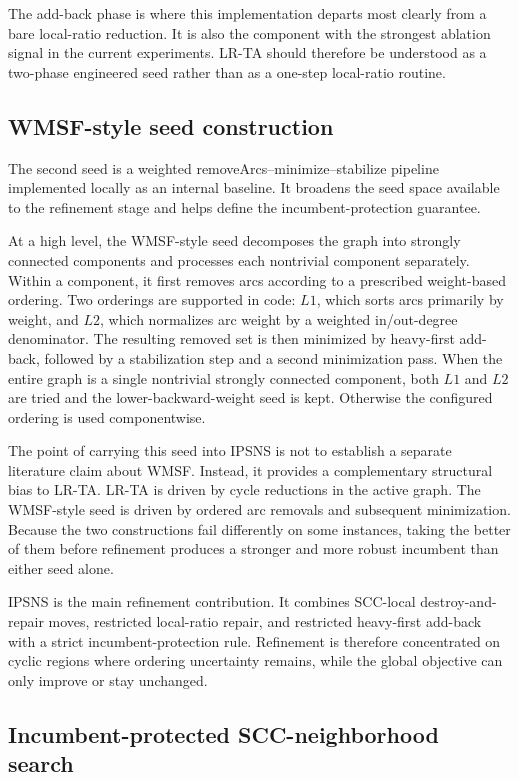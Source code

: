 The add-back phase is where this implementation departs most clearly from a bare local-ratio reduction. It is also the component with the strongest ablation signal in the current experiments. LR-TA should therefore be understood as a two-phase engineered seed rather than as a one-step local-ratio routine.

\subsection{WMSF-style seed construction}
\label{subsec:wmsf}

The second seed is a weighted removeArcs--minimize--stabilize pipeline implemented locally as an internal baseline. It broadens the seed space available to the refinement stage and helps define the incumbent-protection guarantee.

At a high level, the WMSF-style seed decomposes the graph into strongly connected components and processes each nontrivial component separately. Within a component, it first removes arcs according to a prescribed weight-based ordering. Two orderings are supported in code: \(L1\), which sorts arcs primarily by weight, and \(L2\), which normalizes arc weight by a weighted in/out-degree denominator. The resulting removed set is then minimized by heavy-first add-back, followed by a stabilization step and a second minimization pass. When the entire graph is a single nontrivial strongly connected component, both \(L1\) and \(L2\) are tried and the lower-backward-weight seed is kept. Otherwise the configured ordering is used componentwise.

The point of carrying this seed into IPSNS is not to establish a separate literature claim about WMSF. Instead, it provides a complementary structural bias to LR-TA. LR-TA is driven by cycle reductions in the active graph. The WMSF-style seed is driven by ordered arc removals and subsequent minimization. Because the two constructions fail differently on some instances, taking the better of them before refinement produces a stronger and more robust incumbent than either seed alone.

IPSNS is the main refinement contribution. It combines SCC-local destroy-and-repair moves, restricted local-ratio repair, and restricted heavy-first add-back with a strict incumbent-protection rule. Refinement is therefore concentrated on cyclic regions where ordering uncertainty remains, while the global objective can only improve or stay unchanged.

\subsection{Incumbent-protected SCC-neighborhood search}
\label{subsec:ipsns}

